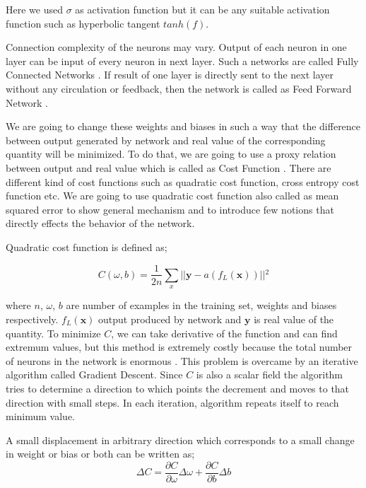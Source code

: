 \documentclass[a4paper,times,12pt]{article}
\begin{document}
Here we used $\sigma$ as activation function but it can be any suitable activation function such as hyperbolic tangent $tanh(f)$.  

Connection complexity of the neurons may vary. Output of each neuron in one layer can be input of every neuron in next layer. Such a networks are called Fully Connected Networks \cite{nielsen2015neural}. If result of one layer is directly sent to the next layer without any circulation or feedback, then the network is called as Feed Forward Network \cite{nielsen2015neural}.

We are going to change these weights and biases in such a way that the difference between output generated by network and real value of the corresponding quantity will be minimized. To do that, we are going to use a proxy relation between output and real value which is called as Cost Function \cite{nielsen2015neural}. There are different kind of cost functions such as quadratic cost function, cross entropy cost function etc. We are going to use quadratic cost function also called as mean squared error to show general mechanism and to introduce few notions that directly effects the behavior of the network. 


Quadratic cost function is defined as;

\begin{equation}
\label{eq:NT_Quadratic}
C(\omega, b) = \frac{1}{2n} \sum\limits_{x} || \boldsymbol{y} - a(f_L(\boldsymbol{x})) ||{^2} 
\end{equation}

where $n$, $\omega$, $b$ are number of examples in the training set, weights and biases respectively. $f_L(\boldsymbol{x})$ output produced by network and $\boldsymbol{y}$ is real value of the quantity. To minimize $C$, we can take derivative of the function and can find extremum values, but this method is extremely costly because the total number of neurons in the network is enormous \cite{nielsen2015neural}. This problem is overcame by an iterative algorithm called Gradient Descent. Since $C$ is also a scalar field the algorithm tries to determine a direction to which points the decrement and moves to that direction with small steps. In each iteration, algorithm repeats itself to reach minimum value. 

A small displacement in arbitrary direction which corresponds to a small change in weight or bias or both can be written as;
\begin{equation}
\label{eq:NT_Quadratic_min}
\Delta{C} = \frac{\partial{C}}{\partial{\omega}}\Delta{\omega} + \frac{\partial{C}}{\partial{b}}\Delta{b}
\end{equation}
\end{document}
